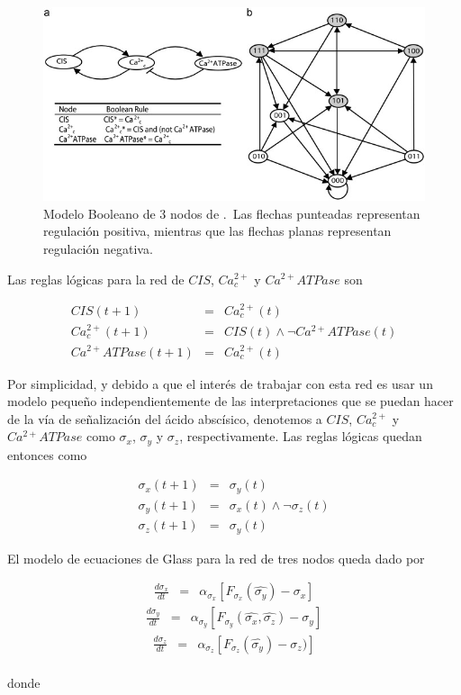 \begin{figure}[hbt]
\includegraphics[width=0.9\linewidth]{gfx/red3nodos}
\caption[Modelo Booleano de 3 nodos]{Modelo Booleano de 3 nodos de \citeauthor{Reka3Nodos2010} \citep{Reka3Nodos2010}.\ Las flechas punteadas representan regulación positiva, mientras que las flechas planas representan regulación negativa.}\label{fig:red3reka}
\end{figure}

Las reglas lógicas para la red de $CIS$, $Ca^{2+}_c$ y $Ca^{2+}ATPase$ son

\begin{eqnarray}
   	CIS(t+1) & = & Ca^{2+}_c(t) \\ 
    Ca^{2+}_c(t+1) & = & CIS(t) \wedge \neg Ca^{2+}ATPase(t) \\ 
    Ca^{2+}ATPase(t+1) & = & Ca^{2+}_c(t)
\end{eqnarray}


Por simplicidad, y debido a que el interés de trabajar con esta red es usar un modelo pequeño independientemente de las interpretaciones que se puedan hacer de la vía de señalización del ácido abscísico, denotemos a $CIS$, $Ca^{2+}_c$ y $Ca^{2+}ATPase$ como $\sigma_x$, $\sigma_y$ y $\sigma_z$, respectivamente. Las reglas lógicas quedan entonces como

\begin{eqnarray}
	\sigma_x(t+1) & = & \sigma_y(t) \\ 
    \sigma_y(t+1) & = & \sigma_x(t) \wedge \neg \sigma_z(t) \\ 
    \sigma_z(t+1) & = & \sigma_y(t)
\end{eqnarray}

El modelo de ecuaciones de Glass para la red de tres nodos queda dado por

\begin{eqnarray}\label{glass1_3nodos}
\frac{d\sigma_x}{dt} & = & \alpha_{\sigma_x} [F_{\sigma_x}(\widehat{\sigma_y}) - \sigma_x]
\end{eqnarray}
\begin{eqnarray}\label{glass2_3nodos}
\frac{d\sigma_y}{dt} & = & \alpha_{\sigma_y} [F_{\sigma_y}(\widehat{\sigma_x}, \widehat{\sigma_z}) - \sigma_y]
\end{eqnarray}
\begin{eqnarray}\label{glass3_3nodos}
\frac{d\sigma_z}{dt} & = & \alpha_{\sigma_z} [F_{\sigma_z}(\widehat{\sigma_y}) - \sigma_z)]
\end{eqnarray}
\\
donde

